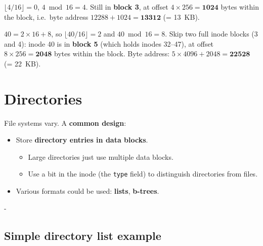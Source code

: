 \documentclass[11pt,a4paper]{article}
\makeatletter
\newcommand{\keepspace}[1]{\par\penalty-100\begingroup
  \setlength{\dimen@}{#1}\dimen@ii\pagegoal\advance\dimen@ii-\pagetotal
  \ifdim\dimen@>\dimen@ii\ifdim\dimen@ii>\z@\vfil\fi\break\fi\endgroup}
\makeatother
\begin{document}
\begin{quizbox}
\(\lfloor 4/16\rfloor = 0\), \(4 \bmod 16 = 4\). Still in \textbf{block 3},
at offset \(4\times256 = \mathbf{1024}\) bytes within the block, i.e.\
byte address \(12288 + 1024 = \mathbf{13312}\) (= 13~KB).
\end{quizbox}

\begin{quizbox}
\(40 = 2\times16 + 8\), so \(\lfloor 40/16\rfloor = 2\) and
\(40 \bmod 16 = 8\). Skip two full inode blocks (3 and 4): inode 40 is in
\textbf{block 5} (which holds inodes 32--47), at offset
\(8\times256 = \mathbf{2048}\) bytes within the block. Byte address:
\(5\times4096 + 2048 = \mathbf{22528}\) (= 22~KB).
\end{quizbox}

\section{Directories}

File systems vary. A \textbf{common design}:
\begin{itemize}
  \item Store \textbf{directory entries in data blocks}.
  \begin{itemize}
    \item Large directories just use multiple data blocks.
    \item Use a bit in the inode (the \texttt{type} field) to distinguish
          directories from files.
  \end{itemize}
  \item Various formats could be used: \textbf{lists}, \textbf{b-trees}.
\end{itemize}

\keepspace{8\baselineskip}
\subsection{Simple directory list example}
\end{document}
